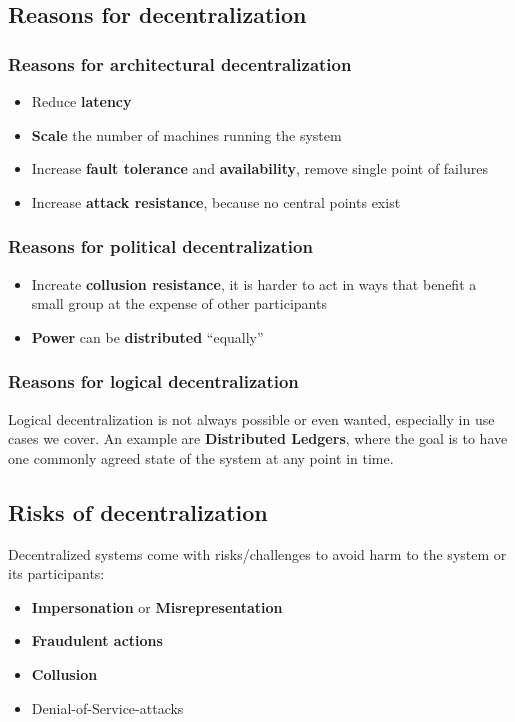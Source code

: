 \documentclass[12pt,A4]{extarticle}
\begin{document}
\subsection{Reasons for decentralization}
\subsubsection{Reasons for architectural decentralization}
\begin{itemize}
  \item{Reduce \textbf{latency}}
  \item{\textbf{Scale} the number of machines running the system}
  \item{Increase \textbf{fault tolerance} and \textbf{availability}, remove single point of failures}
  \item{Increase \textbf{attack resistance}, because no central points exist}
\end{itemize}

\subsubsection{Reasons for political decentralization}
\begin{itemize}
  \item{Increate \textbf{collusion resistance}, it is harder to act in ways that benefit a small group at the expense of other participants}
  \item{\textbf{Power} can be \textbf{distributed} ``equally''}
\end{itemize}

\subsubsection{Reasons for logical decentralization}
Logical decentralization is not always possible or even wanted, especially in use cases we cover. An example are \textbf{Distributed Ledgers}, where the goal is to have one commonly agreed state of the system at any point in time.

\subsection{Risks of decentralization}
Decentralized systems come with risks/challenges to avoid harm to the system or its participants:
\begin{itemize}
  \item{\textbf{Impersonation} or \textbf{Misrepresentation}}
  \item{\textbf{Fraudulent actions}}
  \item{\textbf{Collusion}}
  \item{Denial-of-Service-attacks}
\end{itemize}

\newpage


\end{document}
